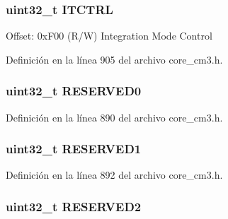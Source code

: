 \subsubsection[{\texorpdfstring{I\+T\+C\+T\+RL}{ITCTRL}}]{ uint32\+\_\+t I\+T\+C\+T\+RL}\hypertarget{struct_t_p_i___type_ad987483f555c0f6034ef24a8840f337d}{}\label{struct_t_p_i___type_ad987483f555c0f6034ef24a8840f337d}
Offset\+: 0x\+F00 (R/W) Integration Mode Control 

Definición en la línea 905 del archivo core\+\_\+cm3.\+h.

\subsubsection[{\texorpdfstring{R\+E\+S\+E\+R\+V\+E\+D0}{RESERVED0}}]{\setlength{\rightskip}{0pt plus 5cm}uint32\+\_\+t R\+E\+S\+E\+R\+V\+E\+D0}\hypertarget{struct_t_p_i___type_af2c92c7cb13569aaff6b4f5a25de5056}{}\label{struct_t_p_i___type_af2c92c7cb13569aaff6b4f5a25de5056}


Definición en la línea 890 del archivo core\+\_\+cm3.\+h.

\subsubsection[{\texorpdfstring{R\+E\+S\+E\+R\+V\+E\+D1}{RESERVED1}}]{\setlength{\rightskip}{0pt plus 5cm}uint32\+\_\+t R\+E\+S\+E\+R\+V\+E\+D1}\hypertarget{struct_t_p_i___type_ab90aea487bf1662e59617af05b30f253}{}\label{struct_t_p_i___type_ab90aea487bf1662e59617af05b30f253}


Definición en la línea 892 del archivo core\+\_\+cm3.\+h.

\subsubsection[{\texorpdfstring{R\+E\+S\+E\+R\+V\+E\+D2}{RESERVED2}}]{\setlength{\rightskip}{0pt plus 5cm}uint32\+\_\+t R\+E\+S\+E\+R\+V\+E\+D2}\hypertarget{struct_t_p_i___type_a4e4e19be116d8ccdcb242401cfb3048b}{}\label{struct_t_p_i___type_a4e4e19be116d8ccdcb242401cfb3048b}


